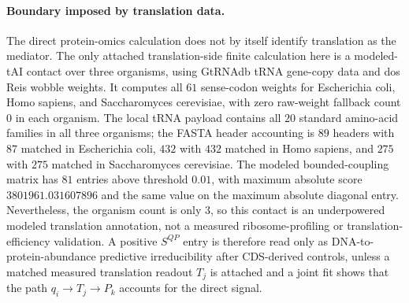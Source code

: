 \paragraph{Boundary imposed by translation data.}
The direct protein-omics calculation does not by itself identify translation as the mediator.  The only attached translation-side finite calculation here is a modeled-tAI contact over three organisms, using GtRNAdb tRNA gene-copy data and dos Reis wobble weights.  It computes all $61$ sense-codon weights for Escherichia coli, Homo sapiens, and Saccharomyces cerevisiae, with zero raw-weight fallback count $0$ in each organism.  The local tRNA payload contains all $20$ standard amino-acid families in all three organisms; the FASTA header accounting is $89$ headers with $87$ matched in Escherichia coli, $432$ with $432$ matched in Homo sapiens, and $275$ with $275$ matched in Saccharomyces cerevisiae.  The modeled bounded-coupling matrix has $81$ entries above threshold $0.01$, with maximum absolute score $3801961.031607896$ and the same value on the maximum absolute diagonal entry.  Nevertheless, the organism count is only $3$, so this contact is an underpowered modeled translation annotation, not a measured ribosome-profiling or translation-efficiency validation.  A positive $S^{QP}$ entry is therefore read only as DNA-to-protein-abundance predictive irreducibility after CDS-derived controls, unless a matched measured translation readout $T_j$ is attached and a joint fit shows that the path $q_i \to T_j \to P_k$ accounts for the direct signal.

